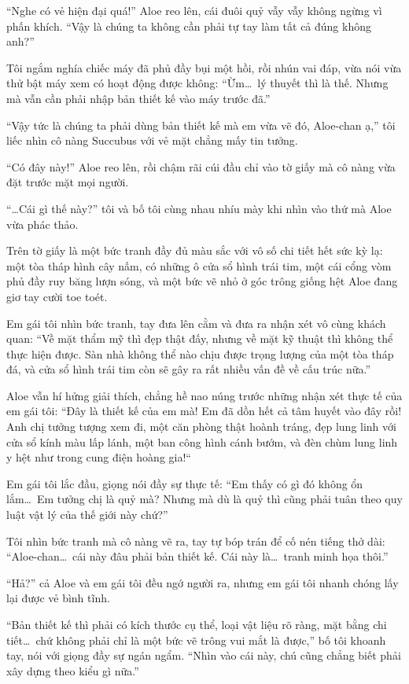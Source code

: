 \documentclass[../main.tex]{subfiles}
\begin{document}
``Nghe có vẻ hiện đại quá!'' Aloe reo lên, cái đuôi quỷ vẫy vẫy không ngừng vì phấn khích. ``Vậy là chúng ta không cần phải tự tay làm tất cả đúng không anh?''

Tôi ngắm nghía chiếc máy đã phủ đầy bụi một hồi, rồi nhún vai đáp, vừa nói vừa thử bật máy xem có hoạt động được không: ``Ừm\dots\ lý thuyết thì là thế. Nhưng mà vẫn cần phải nhập bản thiết kế vào máy trước đã.''

``Vậy tức là chúng ta phải dùng bản thiết kế mà em vừa vẽ đó, Aloe-chan ạ,'' tôi liếc nhìn cô nàng Succubus với vẻ mặt chẳng mấy tin tưởng.

``Có đây này!'' Aloe reo lên, rồi chậm rãi cúi đầu chỉ vào tờ giấy mà cô nàng vừa đặt trước mặt mọi người.

``\dots Cái gì thế này?'' tôi và bố tôi cùng nhau nhíu mày khi nhìn vào thứ mà Aloe vừa phác thảo.

Trên tờ giấy là một bức tranh đầy đủ màu sắc với vô số chi tiết hết sức kỳ lạ: một tòa tháp hình cây nấm, có những ô cửa sổ hình trái tim, một cái cổng vòm phủ đầy ruy băng lượn sóng, và một bức vẽ nhỏ ở góc trông giống hệt Aloe đang giơ tay cười toe toét.

Em gái tôi nhìn bức tranh, tay đưa lên cằm và đưa ra nhận xét vô cùng khách quan: ``Về mặt thẩm mỹ thì đẹp thật đấy, nhưng về mặt kỹ thuật thì không thể thực hiện được. Sàn nhà không thể nào chịu được trọng lượng của một tòa tháp đá, và cửa sổ hình trái tim còn sẽ gây ra rất nhiều vấn đề về cấu trúc nữa.''

Aloe vẫn hí hửng giải thích, chẳng hề nao núng trước những nhận xét thực tế của em gái tôi: ``Đây là thiết kế của em mà! Em đã dồn hết cả tâm huyết vào đây rồi! Anh chị tưởng tượng xem đi, một căn phòng thật hoành tráng, đẹp lung linh với cửa sổ kính màu lấp lánh, một ban công hình cánh bướm, và đèn chùm lung linh y hệt như trong cung điện hoàng gia!``

Em gái tôi lắc đầu, giọng nói đầy sự thực tế: ``Em thấy có gì đó không ổn lắm\dots\ Em tưởng chị là quỷ mà? Nhưng mà dù là quỷ thì cũng phải tuân theo quy luật vật lý của thế giới này chứ?''

Tôi nhìn bức tranh mà cô nàng vẽ ra, tay tự bóp trán để cố nén tiếng thở dài: ``Aloe-chan\dots\ cái này đâu phải bản thiết kế. Cái này là\dots\ tranh minh họa thôi.''

``Hả?'' cả Aloe và em gái tôi đều ngớ người ra, nhưng em gái tôi nhanh chóng lấy lại được vẻ bình tĩnh.

``Bản thiết kế thì phải có kích thước cụ thể, loại vật liệu rõ ràng, mặt bằng chi tiết\dots\ chứ không phải chỉ là một bức vẽ trông vui mắt là được,'' bố tôi khoanh tay, nói với giọng đầy sự ngán ngẩm. ``Nhìn vào cái này, chú cũng chẳng biết phải xây dựng theo kiểu gì nữa.''
\end{document}
